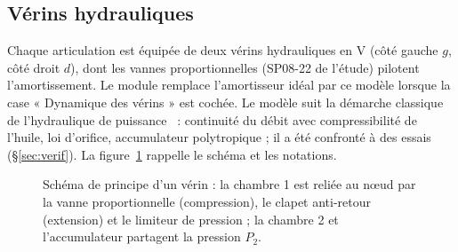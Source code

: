\documentclass[11pt,a4paper]{article}
\newcommand{\dt}[1]{\dot{#1}}
\newcommand{\fichier}[1]{\texttt{\detokenize{#1}}}
\begin{document}
\subsection{Vérins hydrauliques}\label{sec:verins}
Chaque articulation est équipée de deux vérins hydrauliques en V (côté gauche $g$, côté droit $d$), dont les vannes proportionnelles (SP08-22 de l'étude) pilotent l'amortissement. Le module \fichier{verin.js} remplace l'amortisseur idéal par ce modèle lorsque la case « Dynamique des vérins » est cochée. Le modèle suit la démarche classique de l'hydraulique de puissance~\cite{Merritt1967,Watton2009,Manring2005} : continuité du débit avec compressibilité de l'huile, loi d'orifice, accumulateur polytropique ; il a été confronté à des essais (§\ref{sec:verif}). La figure~\ref{fig:hydro} rappelle le schéma et les notations.

\begin{figure}[H]\centering
{}
\caption{Schéma de principe d'un vérin : la chambre 1 est reliée au n\oe ud par la vanne proportionnelle (compression), le clapet anti-retour (extension) et le limiteur de pression ; la chambre 2 et l'accumulateur partagent la pression $P_2$.}\label{fig:hydro}
\end{figure}
\end{document}
